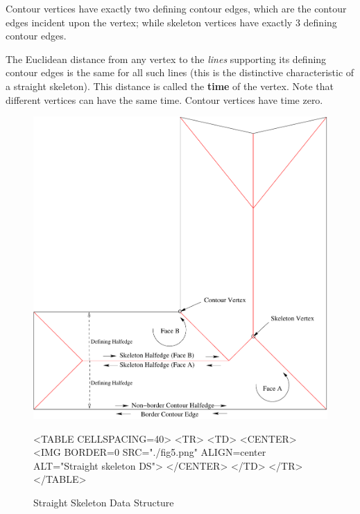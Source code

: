 Contour vertices have exactly two defining contour edges, which are the contour edges incident upon the vertex; while skeleton vertices have exactly 3 defining contour edges.

The Euclidean distance from any vertex to the \textit{lines} supporting its defining contour edges is the same for all such lines (this is the distinctive characteristic of a straight skeleton). This distance is called the \textbf{time} of the vertex. Note that different vertices can have the same time. Contour vertices have time zero.

\begin{figure}[htbp]
\begin{ccTexOnly}
\begin{center}
\includegraphics{fig5} %
\end{center}
\end{ccTexOnly}
\caption{Straight Skeleton Data Structure
\label{Simplepoly-offsets}}
\begin{ccHtmlOnly}
<TABLE CELLSPACING=40>
<TR>
<TD>
<CENTER>
<IMG BORDER=0 SRC="./fig5.png" ALIGN=center ALT="Straight skeleton DS">
</CENTER>
</TD>
</TR>
</TABLE>
\end{ccHtmlOnly}
\end{figure}


